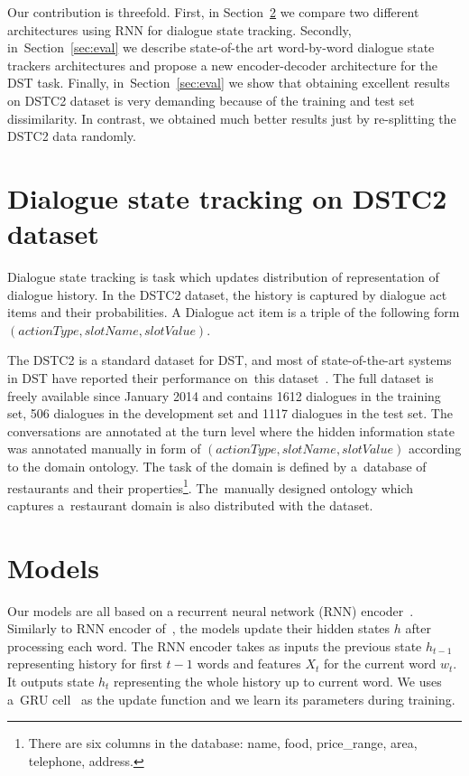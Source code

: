 \documentclass{itatnew}
\def\OD#1{{\color{darkgreen}OD: \it #1}}
\begin{document}
Our contribution is threefold. 
First, in Section~\ref{sec:model} we compare two different architectures using RNN for dialogue state tracking.
Secondly, in~Section~\ref{sec:eval} we describe state-of-the art word-by-word dialogue state trackers architectures and propose a new encoder-decoder architecture for the DST task.
Finally, in~Section~\ref{sec:eval} we show that obtaining excellent results on DSTC2 dataset is very demanding because of the training and test set dissimilarity. In contrast, we obtained much better results just by re-splitting the DSTC2 data randomly.

\section{Dialogue state tracking on DSTC2 dataset}
Dialogue state tracking is task which updates distribution of representation of dialogue history.
In the DSTC2 dataset, the history is captured by dialogue act items and their probabilities.
A Dialogue act item is a triple of the following form $(actionType, slotName, slotValue)$.

The DSTC2 is a standard dataset for DST, and most of state-of-the-art systems in DST have reported their performance on~this dataset~\cite{henderson2014second}. 
The full dataset is freely available since January 2014 and contains 1612 dialogues in the training set, 506 dialogues in the development set and 1117 dialogues in the test set.
The conversations are annotated at the turn level where the hidden information state was annotated manually in form of $(actionType, slotName, slotValue)$ according to the domain ontology.
The task of the domain is defined by a~database of restaurants and their properties\footnote{There are six columns in the database: name, food, price\_range, area, telephone, address.}.
The~manually designed ontology which captures a~restaurant domain is also distributed with the dataset.

\section{Models}
\label{sec:model}

Our models are all based on a recurrent neural network (RNN) encoder~\cite{werbos1990backpropagation}. Similarly to RNN encoder of~\cite{zilka2015incremental}, the models update their hidden states $h$ after processing each word. The RNN encoder takes as inputs the previous state $h_{t-1}$ representing history for first $t-1$ words and features $X_t$ for the current word $w_t$. It outputs state $h_t$ representing the whole history up to current word.
We uses a~GRU cell~\cite{cho2014gru} as the update function and we learn its parameters during training.
\end{document}
